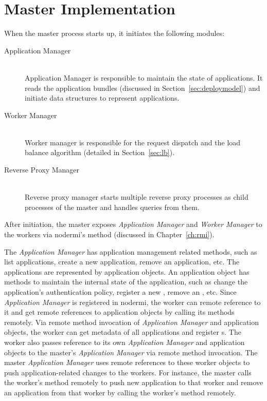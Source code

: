 \section{Master Implementation}

When the master process starts up, it initiates the following modules:

\begin{description}
\item[Application Manager] \hfill \\
Application Manager is responsible to maintain the state of applications. It
reads the application bundles (discussed in Section~\ref{sec:deploymodel}) and
initiate data structures to represent applications.

\item[Worker Manager] \hfill \\
Worker manager is responsible for the request dispatch
and the load balance algorithm (detailed in Section~\ref{sec:lb}).

\item[Reverse Proxy Manager] \hfill \\
Reverse proxy manager starts multiple reverse proxy processes as child
processes of the master and handles queries from them.
\end{description}

After initiation, the master exposes \emph{Application Manager} and
\emph{Worker Manager} to the workers via nodermi's   method
(discussed in Chapter~\ref{ch:rmi}).

The \emph{Application Manager} has application management related  methods,
such as list applications, create a new application, remove an application,
etc.  The applications are represented by application objects. An application
object has methods to maintain the internal state of the application, such as
change the application's authentication policy, register a new \appins, remove
an \appins, etc.  Since \emph{Application Manager} is registered in nodermi,
the worker can remote reference to it and get remote references to application
objects by calling its methods remotely. Via remote method invocation of
\emph{Application Manager} and application objects, the worker can get
metadata of all applications and register \appins{}s.  The worker also passes
reference to its own \emph{Application Manager}  and application objects to
the master's \emph{Application Manager} via remote method invocation.  The
master \emph{Application Manager}  uses remote references to these worker
objects to push application-related changes to the  workers.  For instance,
the master calls  the worker's   method remotely   to
push new application to that worker and remove an application from that worker
by calling the worker's  method remotely.

